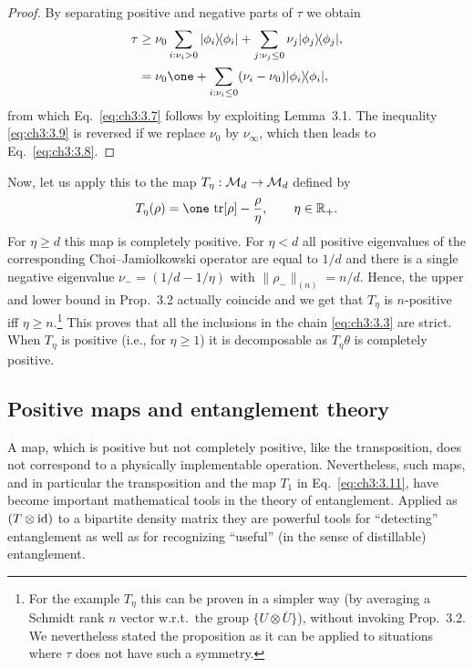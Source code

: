 \documentclass[11pt,a4paper]{article}
\numberwithin{equation}{section}
\begin{document}
\begin{proof}
    By separating positive and negative parts of $\tau$ we obtain
    \begin{align}
        \tau
         &\ge \nu_0 \sum_{i:\nu_i>0} \ketbra{\phi_i}{\phi_i}
        + \sum_{j:\nu_j\le 0} \nu_j \ketbra{\phi_j}{\phi_j},
        \label{eq:ch3:3.9}
        \\
         &= \nu_0 \one + \sum_{i:\nu_i\le 0} (\nu_i-\nu_0)\ketbra{\phi_i}{\phi_i},
        \label{eq:ch3:3.10}
    \end{align}
    from which Eq.~\eqref{eq:ch3:3.7} follows by exploiting Lemma~3.1. The inequality \eqref{eq:ch3:3.9} is
    reversed if we replace $\nu_0$ by $\nu_\infty$, which then leads to Eq.~\eqref{eq:ch3:3.8}.
\end{proof}

Now, let us apply this to the map $T_\eta:\mathcal{M}_d\to \mathcal{M}_d$ defined by
\begin{equation}\label{eq:ch3:3.11}
    T_\eta(\rho) = \one\,\tr[\rho] - \frac{\rho}{\eta},
    \qquad \eta\in \RR_+.
\end{equation}
For $\eta\ge d$ this map is completely positive. For $\eta<d$ all positive eigenvalues of the corresponding
Choi--Jamiolkowski operator are equal to $1/d$ and there is a single negative eigenvalue
$\nu_-=(1/d-1/\eta)$ with $\|\rho_-\|_{(n)}=n/d$. Hence, the upper and lower bound in Prop.~3.2 actually coincide
and we get that $T_\eta$ is $n$-positive iff $\eta\ge n$.\footnote{For the example $T_\eta$ this can be proven in a
    simpler way (by averaging a Schmidt rank $n$ vector w.r.t.\ the group $\{U\otimes \overline{U}\}$), without invoking
    Prop.~3.2. We nevertheless stated the proposition as it can be applied to situations where $\tau$ does not have such
    a symmetry.} This proves that all the inclusions in the chain \eqref{eq:ch3:3.3} are strict. When $T_\eta$ is
positive (i.e., for $\eta\ge 1$) it is decomposable as $T_\eta\theta$ is completely positive.

\subsection{Positive maps and entanglement theory}

A map, which is positive but not completely positive, like the transposition, does not correspond to a physically
implementable operation. Nevertheless, such maps, and in particular the transposition and the map $T_1$ in
Eq.~\eqref{eq:ch3:3.11}, have become important mathematical tools in the theory of entanglement. Applied as
$(T\otimes \mathrm{id})$ to a bipartite density matrix they are powerful tools for ``detecting'' entanglement as well as for
recognizing ``useful'' (in the sense of distillable) entanglement.
\end{document}
